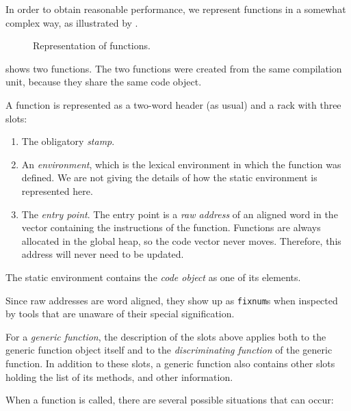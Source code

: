 In order to obtain reasonable performance, we represent functions in a
somewhat complex way, as illustrated by
.

\begin{figure}
\begin{center}
\end{center}
\caption{\label{fig-function-representation}
Representation of functions.}
\end{figure}

 shows two functions.  The two
functions were created from the same compilation unit, because they
share the same code object. 

A function is represented as a two-word header (as usual) and a
rack with three slots:

\begin{enumerate}
\item The obligatory \emph{stamp}.
\item An \emph{environment}, which is the lexical environment in which
  the function was defined.  We are not giving the details of how the
  static environment is represented here.
\item The \emph{entry point}.  The entry
  point is a \emph{raw address} of an aligned word in the vector
  containing the instructions of the function.  Functions are always
  allocated in the global heap, so the code vector never moves.
  Therefore, this address will never need to be updated.
\end{enumerate}

The static environment contains the \emph{code object} as one of its
elements.

Since raw addresses are word aligned, they show up as \texttt{fixnum}s
when inspected by tools that are unaware of their special
signification.

For a \emph{generic function}, the description of the slots above
applies both to the generic function object itself and to the
\emph{discriminating function} of the generic function.  In addition
to these slots, a generic function also contains other slots holding
the list of its methods, and other information.

When a function is called, there are several possible situations that
can occur:

